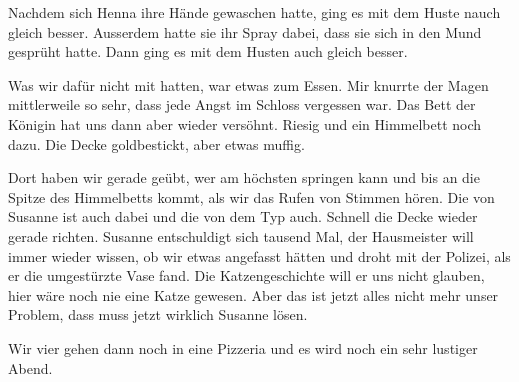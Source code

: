 Nachdem sich Henna ihre Hände gewaschen hatte, ging es mit dem Huste nauch
gleich besser. Ausserdem hatte sie ihr Spray dabei, dass sie sich in den Mund
gesprüht hatte. Dann ging es mit dem Husten auch gleich besser. 
 
Was wir dafür nicht mit hatten, war etwas zum Essen. Mir knurrte der Magen
mittlerweile so sehr, dass jede Angst im Schloss vergessen war. Das Bett der
Königin hat uns dann aber wieder versöhnt. Riesig und ein Himmelbett noch dazu.
Die Decke goldbestickt, aber etwas muffig. 

Dort haben wir gerade geübt, wer am höchsten springen kann und bis an die
Spitze des Himmelbetts kommt, als wir das Rufen von Stimmen hören. Die von
Susanne ist auch dabei und die von dem Typ auch. Schnell die Decke wieder gerade richten. Susanne entschuldigt sich tausend Mal, der Hausmeister will immer wieder wissen, ob wir etwas angefasst hätten und droht mit der Polizei, als er die umgestürzte Vase fand. Die Katzengeschichte will er uns nicht glauben, hier wäre noch nie eine Katze gewesen. Aber das ist jetzt alles nicht mehr unser Problem, dass muss jetzt wirklich Susanne lösen.

Wir vier gehen dann noch in eine Pizzeria und es wird noch ein sehr lustiger Abend. \hfill {\color{DeepPink}\decofourleft}




